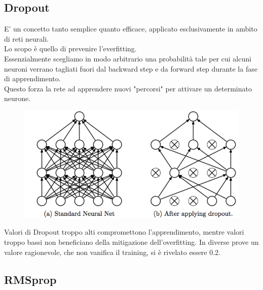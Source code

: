 \documentclass[12pt]{article}
\begin{document}

\subsection{Dropout}

E' un concetto tanto semplice quanto efficace, applicato
esclusivamente in ambito di reti neurali.\\
Lo scopo è quello di prevenire l'everfitting.\\
Essenzialmente scegliamo in modo arbitrario una probabilità
tale per cui alcuni neuroni verrano tagliati fuori dal backward step
e da forward step durante la fase di apprendimento.\\
Questo forza la rete ad apprendere nuovi "percorsi" per attivare
un determinato neurone.

\begin{figure}[H]{}
    \centering
    \includegraphics[scale=0.5]{../images/drop.png}
    \label{fig:cc}
\end{figure}

Valori di Dropout troppo alti compromettono l'apprendimento, mentre
valori troppo bassi non beneficiano della mitigazione dell'overfitting.
In diverse prove un valore ragionevole, che non vanifica il training,
si è rivelato essere 0.2.


\subsection{RMSprop}
\end{document}
